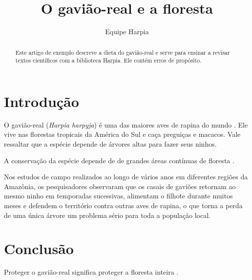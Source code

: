 \documentclass[12pt,brazil]{article}
\title{O gavião-real e a floresta}
\author{Equipe Harpia}
\begin{document}
\maketitle

\begin{abstract}
Este artigo de exemplo descreve a dieta do gavião-real e serve para ensinar a revisar textos
científicos com a biblioteca Harpia. Ele contém erros de propósito.
\end{abstract}

\section{Introdução}

O gavião-real (\textit{Harpia harpyja}) é uma das maiores aves de rapina do mundo
\cite{silva2020}. Ele vive nas florestas tropicais da América do Sul e caça preguiças e macacos.
Vale ressaltar que a espécie depende de árvores altas para fazer seus ninhos.

A conservação da espécie depende de de grandes áreas contínuas de floresta \cite{souza2018}.

Nos estudos de campo realizados ao longo de vários anos em diferentes regiões da Amazônia, os
pesquisadores observaram que os casais de gaviões retornam ao mesmo ninho em temporadas
sucessivas, alimentam o filhote durante muitos meses e defendem o território contra outras aves
de rapina, o que torna a perda de uma única árvore um problema sério para toda a população local.



\section{Conclusão}

Proteger o gavião-real significa proteger a floresta inteira \cite{inexistente2021}.



\end{document}
